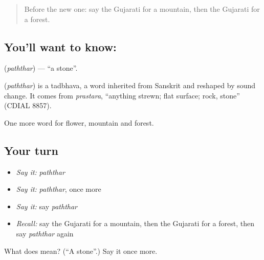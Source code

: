 \label{lesson:GU-C64-stone}



\begin{quote}
Before the new one: say the Gujarati for a mountain, then the Gujarati for a forest.
\end{quote}

\subsection*{You'll want to know: }
\textbf{} (\emph{paththar}) — \textquotedblleft{}a stone\textquotedblright{}.

\begin{cousinweb}
\textbf{} (\emph{paththar}) is a tadbhava, a word inherited from Sanskrit and reshaped by sound change. It comes from \emph{prastara}, \textquotedblleft{}anything strewn; flat surface; rock, stone\textquotedblright{} (CDIAL 8857).
\end{cousinweb}

\begin{grammarlens}[title={What you've built}]
One more word for flower, mountain and forest.
\end{grammarlens}

\subsection*{Your turn}
\begin{itemize}
\raggedright
  \item \emph{Say it:} \emph{paththar}
  \item \emph{Say it:} \emph{paththar}, once more
  \item \emph{Say it:} say \emph{paththar}
  \item \emph{Recall:} say the Gujarati for a mountain, then the Gujarati for a forest, then say \emph{paththar} again
\end{itemize}

\begin{tcolorbox}[breakable,colback=teal!4,colframe=teal!35!black,title={Before you move on}]
What does  mean? (\textquotedblleft{}A stone\textquotedblright{}.) Say it once more.
\end{tcolorbox}
